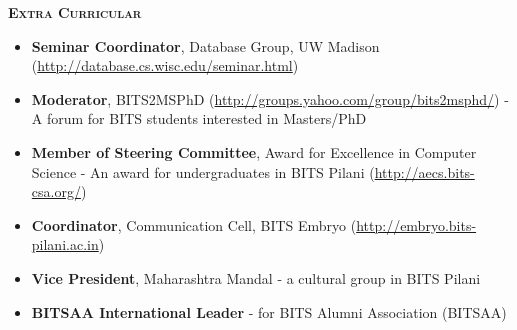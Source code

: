 \documentclass[11pt]{article}
\newcommand{\graybox}[1]{\begin{mdframed}[backgroundcolor=light-gray, linecolor=light-gray, roundcorner=10pt, shadow=false, shadowsize=1pt]
\Large{\textbf{\textsc{#1}}}
\end{mdframed}}
\begin{document}
\graybox{Extra Curricular}
\begin{itemize}\addtolength{\itemsep}{-0.5\baselineskip}
	\item{\textbf{Seminar Coordinator}, Database Group, UW Madison (\url{http://database.cs.wisc.edu/seminar.html})}
	\item{\textbf{Moderator}, BITS2MSPhD (\url{http://groups.yahoo.com/group/bits2msphd/}) - A forum for BITS students interested in Masters/PhD}
	\item{\textbf{Member of Steering Committee},  Award for Excellence in Computer Science - An award for undergraduates in BITS Pilani (\url{http://aecs.bits-csa.org/})}
	\item{\textbf{Coordinator}, Communication Cell, BITS Embryo (\url{http://embryo.bits-pilani.ac.in})}
	\item{\textbf{Vice President}, Maharashtra Mandal - a cultural group in BITS Pilani}
	\item{\textbf{BITSAA International Leader} - for BITS Alumni Association (BITSAA)}
\end{itemize}
\end{document}
